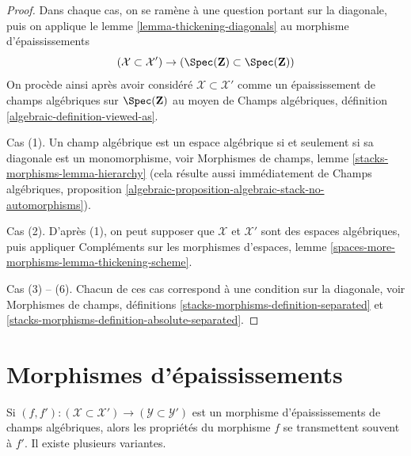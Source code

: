 \begin{proof}
Dans chaque cas, on se ramène à une question portant sur la diagonale, puis
on applique le lemme \ref{lemma-thickening-diagonals} au
morphisme d'épaississements
$$
(\mathcal{X} \subset \mathcal{X}') \to
\left(\Spec(\mathbf{Z}) \subset \Spec(\mathbf{Z})\right)
$$
On procède ainsi après avoir considéré
$\mathcal{X} \subset \mathcal{X}'$ comme un épaississement de champs algébriques
sur $\Spec(\mathbf{Z})$ au moyen de
Champs algébriques, définition \ref{algebraic-definition-viewed-as}.

\medskip\noindent
Cas (1). Un champ algébrique est un espace algébrique si et seulement si sa
diagonale est un monomorphisme, voir
Morphismes de champs, lemme \ref{stacks-morphisms-lemma-hierarchy}
(cela résulte aussi immédiatement de Champs algébriques,
proposition \ref{algebraic-proposition-algebraic-stack-no-automorphisms}).

\medskip\noindent
Cas (2). D'après (1), on peut supposer que $\mathcal{X}$ et $\mathcal{X}'$
sont des espaces algébriques, puis appliquer
Compléments sur les morphismes d'espaces, lemme
\ref{spaces-more-morphisms-lemma-thickening-scheme}.

\medskip\noindent
Cas (3) -- (6). Chacun de ces cas correspond à une condition
sur la diagonale, voir Morphismes de champs, définitions
\ref{stacks-morphisms-definition-separated} et
\ref{stacks-morphisms-definition-absolute-separated}.
\end{proof}









\section{Morphismes d'épaississements}
\label{section-morphisms-thickenings}

\noindent
Si $(f, f') : (\mathcal{X} \subset \mathcal{X}') \to
(\mathcal{Y} \subset \mathcal{Y}')$ est un morphisme
d'épaississements de champs algébriques, alors les propriétés du morphisme
$f$ se transmettent souvent à $f'$. Il existe plusieurs variantes.

